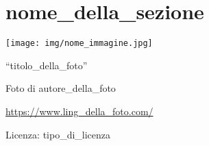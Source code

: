 \part{nome_della_sezione}

\texttt{[image: img/nome\_immagine.jpg]}
  \begin{center}
    {\large ``titolo_della_foto''}\par
    Foto di autore_della_foto\par
    \url{https://www.ling_della_foto.com/}\par
    Licenza: tipo_di_licenza\par
  \end{center}
\clearpage
\cleardoublepage
